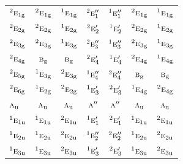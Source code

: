 \documentclass[10pt,a4paper]{article}
\numberwithin{equation}{section}
\newcommand{\irr}[1]{\text{\normalfont\scshape #1}}
\newcommand{\conjpair}[1]{{}^{#1}}
\newcommand{\ptag}[1]{\mathrm{#1}}
\begin{document}
{\begin{longtable}{@{}lcccccc@{}}
$\conjpair{2}\irr{e}_{1\ptag{g}}$ & $\conjpair{2}\irr{e}_{1\ptag{g}}$ & $\conjpair{1}\irr{e}_{1\ptag{g}}$ & $\conjpair{2}\irr{e}_{1}''$ & $\conjpair{1}\irr{e}_{1}''$ & $\conjpair{2}\irr{e}_{1\ptag{g}}$ & $\conjpair{1}\irr{e}_{1\ptag{g}}$\\
$\conjpair{2}\irr{e}_{2\ptag{g}}$ & $\conjpair{2}\irr{e}_{2\ptag{g}}$ & $\conjpair{1}\irr{e}_{2\ptag{g}}$ & $\conjpair{2}\irr{e}_{2}'$ & $\conjpair{1}\irr{e}_{2}'$ & $\conjpair{2}\irr{e}_{2\ptag{g}}$ & $\conjpair{1}\irr{e}_{2\ptag{g}}$\\
$\conjpair{2}\irr{e}_{3\ptag{g}}$ & $\conjpair{2}\irr{e}_{3\ptag{g}}$ & $\conjpair{1}\irr{e}_{3\ptag{g}}$ & $\conjpair{2}\irr{e}_{3}''$ & $\conjpair{1}\irr{e}_{3}''$ & $\conjpair{2}\irr{e}_{3\ptag{g}}$ & $\conjpair{1}\irr{e}_{3\ptag{g}}$\\
$\conjpair{2}\irr{e}_{4\ptag{g}}$ & $\irr{b}_{\ptag{g}}$ & $\irr{b}_{\ptag{g}}$ & $\conjpair{2}\irr{e}_{4}'$ & $\conjpair{1}\irr{e}_{4}'$ & $\conjpair{2}\irr{e}_{4\ptag{g}}$ & $\conjpair{1}\irr{e}_{4\ptag{g}}$\\
$\conjpair{2}\irr{e}_{5\ptag{g}}$ & $\conjpair{1}\irr{e}_{3\ptag{g}}$ & $\conjpair{2}\irr{e}_{3\ptag{g}}$ & $\conjpair{1}\irr{e}_{4}''$ & $\conjpair{2}\irr{e}_{4}''$ & $\irr{b}_{\ptag{g}}$ & $\irr{b}_{\ptag{g}}$\\
$\conjpair{2}\irr{e}_{6\ptag{g}}$ & $\conjpair{1}\irr{e}_{2\ptag{g}}$ & $\conjpair{2}\irr{e}_{2\ptag{g}}$ & $\conjpair{1}\irr{e}_{3}'$ & $\conjpair{2}\irr{e}_{3}'$ & $\conjpair{1}\irr{e}_{4\ptag{g}}$ & $\conjpair{2}\irr{e}_{4\ptag{g}}$\\
$\irr{a}_{\ptag{u}}$ & $\irr{a}_{\ptag{u}}$ & $\irr{a}_{\ptag{u}}$ & $\irr{a}''$ & $\irr{a}''$ & $\irr{a}_{\ptag{u}}$ & $\irr{a}_{\ptag{u}}$\\
$\conjpair{1}\irr{e}_{1\ptag{u}}$ & $\conjpair{1}\irr{e}_{1\ptag{u}}$ & $\conjpair{2}\irr{e}_{1\ptag{u}}$ & $\conjpair{1}\irr{e}_{1}'$ & $\conjpair{2}\irr{e}_{1}'$ & $\conjpair{1}\irr{e}_{1\ptag{u}}$ & $\conjpair{2}\irr{e}_{1\ptag{u}}$\\
$\conjpair{1}\irr{e}_{2\ptag{u}}$ & $\conjpair{1}\irr{e}_{2\ptag{u}}$ & $\conjpair{2}\irr{e}_{2\ptag{u}}$ & $\conjpair{1}\irr{e}_{2}''$ & $\conjpair{2}\irr{e}_{2}''$ & $\conjpair{1}\irr{e}_{2\ptag{u}}$ & $\conjpair{2}\irr{e}_{2\ptag{u}}$\\
$\conjpair{1}\irr{e}_{3\ptag{u}}$ & $\conjpair{1}\irr{e}_{3\ptag{u}}$ & $\conjpair{2}\irr{e}_{3\ptag{u}}$ & $\conjpair{1}\irr{e}_{3}'$ & $\conjpair{2}\irr{e}_{3}'$ & $\conjpair{1}\irr{e}_{3\ptag{u}}$ & $\conjpair{2}\irr{e}_{3\ptag{u}}$\\

\end{longtable}}
\end{document}
